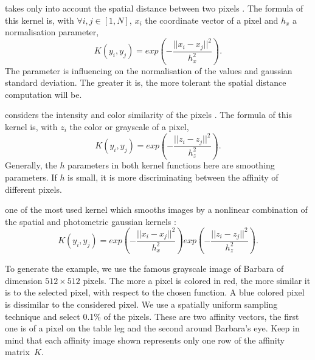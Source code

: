\begin{description}[align=left]
 \item [Spatial Gaussian Kernel] takes only into account the spatial distance between two pixels \cite{siam_slides_2016}.
  The formula of this kernel is, with \(\forall i, j \in [1, N]\), \(x_i\) the coordinate vector of a pixel and \(h_x\) a normalisation parameter,
  \[K(y_i, y_j) = exp(-\frac{||x_i - x_j||^2}{h_x^2}).\]
  The parameter is influencing on the normalisation of the values and gaussian standard deviation.
  The greater it is, the more tolerant the spatial distance computation will be.

 \item [Photometric Gaussian Kernel] considers the intensity and color similarity of the pixels \cite{siam_slides_2016}.
  The formula of this kernel is, with \(z_i\) the color or grayscale of a pixel,
  \[K(y_i, y_j) = exp(-\frac{||z_i - z_j||^2}{h_z^2}).\]
  Generally, the \(h\) parameters in both kernel functions here are smoothing parameters.
  If \(h\) is small, it is more discriminating between the affinity of different pixels.

 \item [Bilateral Kernel] one of the most used kernel which smooths images by a nonlinear combination of the spatial and photometric gaussian kernels \cite{siam_slides_2016} \cite{glide_2014} \cite{bilateral_tomasi_1998}:
  \[K(y_i, y_j) = exp(-\frac{||x_i - x_j||^2}{h_x^2}) exp(-\frac{||z_i - z_j||^2}{h_z^2}).\]

  To generate the example, we use the famous grayscale image of Barbara of dimension \(512 \times 512\) pixels.
  The more a pixel is colored in red, the more similar it is to the selected pixel, with respect to the chosen function.
  A blue colored pixel is dissimilar to the considered pixel.
  We use a spatially uniform sampling technique and select 0.1\% of the pixels.
  These are two affinity vectors, the first one is of a pixel on the table leg and the second around Barbara's eye.
  Keep in mind that each affinity image shown represents only one row of the affinity matrix\ \(K\).


\end{description}
